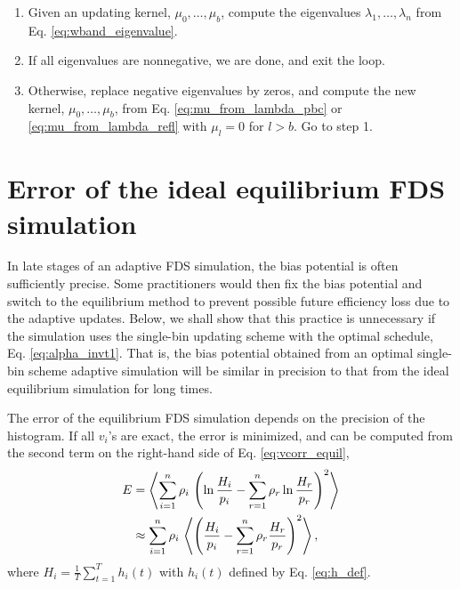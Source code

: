 \documentclass[reprint, floatfix]{revtex4-1}
\begin{document}
%
\begin{enumerate}
  \item
    Given an updating kernel, $\mu_0, \dots, \mu_b$,
    compute the eigenvalues
    $\lambda_1, \dots, \lambda_n$
    from Eq. \eqref{eq:wband_eigenvalue}.
  \item
    If all eigenvalues are nonnegative,
    we are done, and exit the loop.
  \item
    Otherwise, replace negative eigenvalues by zeros,
    and compute the new kernel,
    $\mu_0, \dots, \mu_b$, from
    Eq. \eqref{eq:mu_from_lambda_pbc}
    or
    \eqref{eq:mu_from_lambda_refl}
    with $\mu_l = 0$ for $l > b$.
    Go to step 1.
\end{enumerate}



\section{\label{sec:equilerr}
Error of the ideal equilibrium FDS simulation}




In late stages of an adaptive FDS simulation,
the bias potential is often sufficiently precise.
Some practitioners would then fix
the bias potential and switch
to the equilibrium method
to prevent possible future efficiency loss
due to the adaptive updates.
%
Below, we shall show that this practice is unnecessary
if the simulation uses the single-bin updating scheme
with the optimal schedule, Eq. \eqref{eq:alpha_invt1}.
%
That is, the bias potential obtained from
an optimal single-bin scheme adaptive simulation
will be similar in precision to that from
the ideal equilibrium simulation
for long times.
%

The error of the equilibrium FDS simulation
depends on the precision of the histogram.
%
If all $v_i$'s are exact,
the error is minimized, and can be computed
from the second term
on the right-hand side of Eq. \eqref{eq:vcorr_equil},
%
\begin{align}
  E
  &=
  \left\langle
    \sum_{ i = 1 }^ n
      \rho_i \,
      \left(
        \ln \frac { H_i }
                  { p_i }
        -
        \sum_{r = 1}^n \rho_r
        \ln \frac { H_r }
                  { p_r }
      \right)^2
  \right\rangle
  \notag
  \\
  &
  \approx
  \sum_{ i = 1 }^ n
    \rho_i \,
    \left\langle
      \left(
        \frac { H_i }
              { p_i }
        -
        \sum_{r = 1}^n \rho_r
            \frac { H_r }
                  { p_r }
      \right)^2
    \right\rangle,
\notag
\end{align}
where
$H_i = \frac{1}{T} \sum_{t = 1}^T h_i(t)$
with
$h_i(t)$ defined by Eq. \eqref{eq:h_def}.
\end{document}
